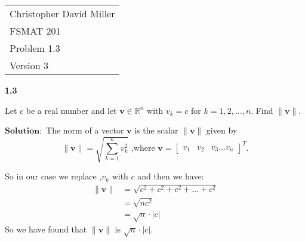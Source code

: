 \documentclass[12pt]{article}
\begin{document}
\newpage
\begin{flushright}
    \begin{tabular}{l}
    Christopher David Miller \\  %
    FSMAT 201 \\  %
    Problem 1.3 \\  %
    Version 3 \\ %
    \end{tabular}
    \end{flushright}
    \vspace{20pt}  %
    
    
    \textbf{1.3}  
    
        Let $c$ be a real number and let $\mathbf{v} \in \mathbb{R}^n$ with $v_k = c$ for $k = 1,2, \dots ,n.$ Find $\|\mathbf{v}\|$.
    
    
        
            $\textbf{Solution}:$ The norm of a vector $\mathbf{v}$ is the scalar $\|  \mathbf{v} \|$ given by   
            $$\|  \mathbf{v} \| = \sqrt{\sum_{k=1}^{n}v_k^2} \text{ ,where } \mathbf{v} = \begin{bmatrix}v_1  &v_2& v_3 \dots v_n
               \end{bmatrix}^{T}.  $$
            
            So in our case we replace ,$v_k$ with $c$ and then we have:
            \begin{align*}
                \|  \mathbf{v} \|& = \sqrt{c^2 + c^2 + c^2 + \dots +c^2}\\
                & = \sqrt{nc^2}\\
                & = \sqrt{n} \cdot \lvert c\rvert
            \end{align*}
            So we have found that $\|\mathbf{v}\|$ is $\sqrt{n} \cdot \lvert c\rvert$.
\end{document}
